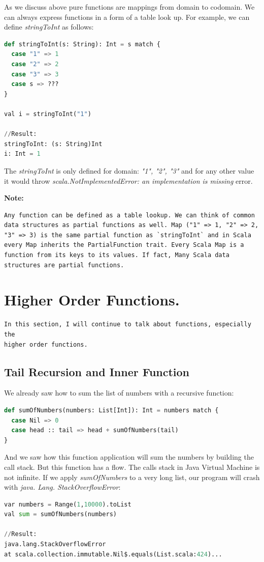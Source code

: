 \documentclass[12pt,twoside,a4paper]{report}
\begin{document}
As we discuss above  pure functions are mappings from domain to codomain. We can always express functions in a form of a table look up. For example, we can define \emph{stringToInt} as follows:
\begin{lstlisting}[language=python]
def stringToInt(s: String): Int = s match {
  case "1" => 1
  case "2" => 2
  case "3" => 3
  case s => ???
}
  
val i = stringToInt("1") 

//Result:
stringToInt: (s: String)Int
i: Int = 1
\end{lstlisting}

The \emph{stringToInt} is only defined for domain: \emph{{"1", "2", "3"}} and for any other value it would throw \emph{scala.NotImplementedError: an implementation is missing} error.

\textbf{Note:}
\begin{lstlisting}
Any function can be defined as a table lookup. We can think of common data structures as partial functions as well. Map ("1" => 1, "2" => 2, "3" => 3) is the same partial function as `stringToInt` and in Scala every Map inherits the PartialFunction trait. Every Scala Map is a function from its keys to its values. If fact, Many Scala data structures are partial functions.
\end{lstlisting}


\section{Higher Order Functions.}\label{6.5}
\begin{lstlisting}
In this section, I will continue to talk about functions, especially the
higher order functions.
\end{lstlisting}

\subsection{Tail Recursion and Inner Function}\label{6.5.1}

We already saw how to sum the list of numbers with a recursive function:
\begin{lstlisting}[language=python]
def sumOfNumbers(numbers: List[Int]): Int = numbers match {
  case Nil => 0
  case head :: tail => head + sumOfNumbers(tail)
}
\end{lstlisting}

And we saw how this function application will sum the numbers by building the call stack. But this function has a flow. The calls stack in Java Virtual Machine is not infinite. If we apply \emph{sumOfNumbers} to a very long list, our program will crash with \emph{java. Lang. StackOverflowError}:
\begin{lstlisting}[language=python]
var numbers = Range(1,10000).toList  
val sum = sumOfNumbers(numbers)
 
//Result:
java.lang.StackOverflowError
at scala.collection.immutable.Nil$.equals(List.scala:424)...
\end{lstlisting}
\end{document}
